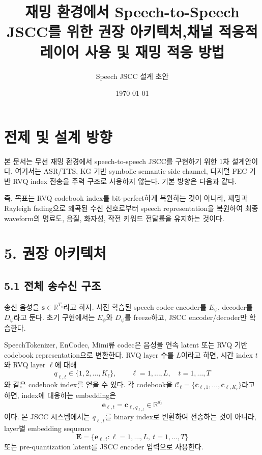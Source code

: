 \documentclass[11pt,a4paper]{article}
\title{재밍 환경에서 Speech-to-Speech JSCC를 위한 권장 아키텍처,\newline 채널 적응적 레이어 사용 및 재밍 적응 방법}
\author{Speech JSCC 설계 초안}
\date{\today}
\begin{document}
\maketitle

\section*{전제 및 설계 방향}
본 문서는 무선 재밍 환경에서 speech-to-speech JSCC를 구현하기 위한 1차 설계안이다. 여기서는 ASR/TTS, KG 기반 symbolic semantic side channel, 디지털 FEC 기반 RVQ index 전송을 주력 구조로 사용하지 않는다. 기본 방향은 다음과 같다.

\begin{center}
\end{center}

즉, 목표는 RVQ codebook index를 bit-perfect하게 복원하는 것이 아니라, 재밍과 Rayleigh fading으로 왜곡된 수신 신호로부터 speech representation을 복원하여 최종 waveform의 명료도, 음질, 화자성, 작전 키워드 전달률을 유지하는 것이다.

\section{5. 권장 아키텍처}

\subsection{5.1 전체 송수신 구조}
송신 음성을 $\bm{s}\in\mathbb{R}^{T_s}$라고 하자. 사전 학습된 speech codec encoder를 $E_{\psi}$, decoder를 $D_{\psi}$라고 둔다. 초기 구현에서는 $E_{\psi}$와 $D_{\psi}$를 freeze하고, JSCC encoder/decoder만 학습한다.

SpeechTokenizer, EnCodec, Mimi류 codec은 음성을 연속 latent 또는 RVQ 기반 codebook representation으로 변환한다. RVQ layer 수를 $L$이라고 하면, 시간 index $t$와 RVQ layer $\ell$에 대해
\begin{equation}
    q_{\ell,t} \in \{1,2,\ldots,K_{\ell}\}, \qquad \ell=1,\ldots,L,\quad t=1,\ldots,T
\end{equation}
와 같은 codebook index를 얻을 수 있다. 각 codebook을 $\mathcal{C}_{\ell}=\{\bm{c}_{\ell,1},\ldots,\bm{c}_{\ell,K_{\ell}}\}$라고 하면, index에 대응하는 embedding은
\begin{equation}
    \bm{e}_{\ell,t} = \bm{c}_{\ell,q_{\ell,t}} \in \mathbb{R}^{d_{\ell}}
\end{equation}
이다. 본 JSCC 시스템에서는 $q_{\ell,t}$를 binary index로 변환하여 전송하는 것이 아니라, layer별 embedding sequence
\begin{equation}
    \bm{E}=\{\bm{e}_{\ell,t}: \ell=1,\ldots,L,\ t=1,\ldots,T\}
\end{equation}
또는 pre-quantization latent를 JSCC encoder 입력으로 사용한다.
\end{document}
